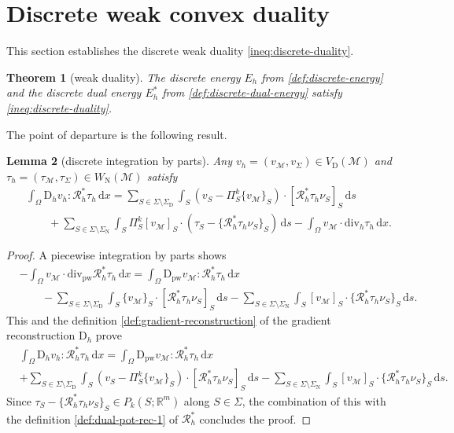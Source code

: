\documentclass[a4paper]{amsart}
\numberwithin{equation}{section}
\newcommand{\R}{\mathbb{R}}
\renewcommand{\d}[1]{\,\mathrm{d}#1}
\renewcommand{\div}{\mathrm{div}}
\newcommand{\Mcal}{\mathcal{M}}
\newcommand{\pw}{\mathrm{pw}}
\newcommand{\D}{\mathrm{D}}
\newtheorem{theorem}{Theorem}[section]
\newtheorem{lemma}[theorem]{Lemma}
\theoremstyle{remark}
\begin{document}
\section{Discrete weak convex duality}\label{sec:discrete-convex-duality}
This section establishes the discrete weak duality \eqref{ineq:discrete-duality}.
\begin{theorem}[weak duality]\label{thm:weak-duality}
	The discrete energy $E_h$ from \eqref{def:discrete-energy} and the discrete dual energy $E_h^*$ from \eqref{def:discrete-dual-energy} satisfy \eqref{ineq:discrete-duality}.
\end{theorem}
The point of departure is the following result.
\begin{lemma}[discrete integration by parts]\label{lem:discrete-integration-by-parts}
	Any $v_h = (v_\Mcal,v_\Sigma) \in V_\mathrm{D}(\Mcal)$ and $\tau_h = (\tau_\Mcal, \tau_\Sigma) \in W_\mathrm{N}(\Mcal)$ satisfy
	\begin{align}
		&\int_\Omega \D_h v_h : \mathcal{R}_h^* \tau_h \d{x} = \sum_{S \in \Sigma\setminus\Sigma_\mathrm{D}} \int_S (v_S - \Pi_S^k\{v_\Mcal\}_S) \cdot [\mathcal{R}_h^* \tau_h \nu_S]_S \d{s}\nonumber\\
		&\qquad+ \sum_{S \in \Sigma\setminus\Sigma_\mathrm{N}} \int_S \Pi_S^k[v_\Mcal]_S \cdot (\tau_S - \{\mathcal{R}_h^* \tau_h \nu_S\}_S) \d{s} - \int_\Omega v_\Mcal \cdot \div_h \tau_h \d{x}.
		\label{eq:discrete-integration-by-parts}
	\end{align}
\end{lemma}
\begin{proof}
	A piecewise integration by parts shows
	\begin{align}\label{eq:proof-dibp-1}
		&- \int_\Omega v_\Mcal \cdot \div_\pw \mathcal{R}_h^* \tau_h \d{x} = \int_\Omega \D_\pw v_\Mcal : \mathcal{R}_h^* \tau_h \d{x}\nonumber\\
		&\qquad - \sum_{S \in \Sigma\setminus\Sigma_\mathrm{D}} \int_S \{v_\Mcal\}_S \cdot [\mathcal{R}_h^* \tau_h \nu_S]_S \d{s} - \sum_{S \in \Sigma\setminus\Sigma_\mathrm{N}} \int_S [v_\Mcal]_S \cdot \{\mathcal{R}_h^* \tau_h \nu_S\}_S \d{s}.
	\end{align}
	This and the definition \eqref{def:gradient-reconstruction} of the gradient reconstruction $\D_h$ prove
	\begin{align*}
		&\int_\Omega \D_h v_h : \mathcal{R}_h^* \tau_h \d{x} = \int_\Omega \D_\pw v_\Mcal : \mathcal{R}_h^* \tau_h \d{x}\\
		&+ \sum_{S \in \Sigma\setminus\Sigma_\mathrm{D}} \int_S (v_S - \Pi_S^k\{v_\Mcal\}_S) \cdot [\mathcal{R}_h^* \tau_h \nu_S]_S \d{s}
		- \sum_{S \in \Sigma\setminus\Sigma_\mathrm{N}} \int_S [v_\Mcal]_S \cdot \{\mathcal{R}_h^* \tau_h \nu_S\}_S \d{s}.
	\end{align*}
	Since $\tau_S - \{\mathcal{R}_h^* \tau_h \nu_S\}_S \in P_k(S;\R^m)$ along $S \in \Sigma$, the combination of this with the definition \eqref{def:dual-pot-rec-1} of $\mathcal{R}^*_h$ concludes the proof.
\end{proof}
\end{document}

